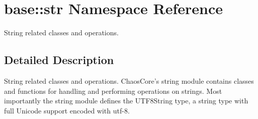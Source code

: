 \hypertarget{namespacebase_1_1str}{\section{base\-:\-:str Namespace Reference}
\label{namespacebase_1_1str}
}


String related classes and operations.  




\subsection{Detailed Description}
String related classes and operations. Chaos\-Core's string module contains classes and functions for handling and performing operations on strings. Most importantly the string module defines the U\-T\-F8\-String type, a string type with full Unicode support encoded with utf-\/8. 